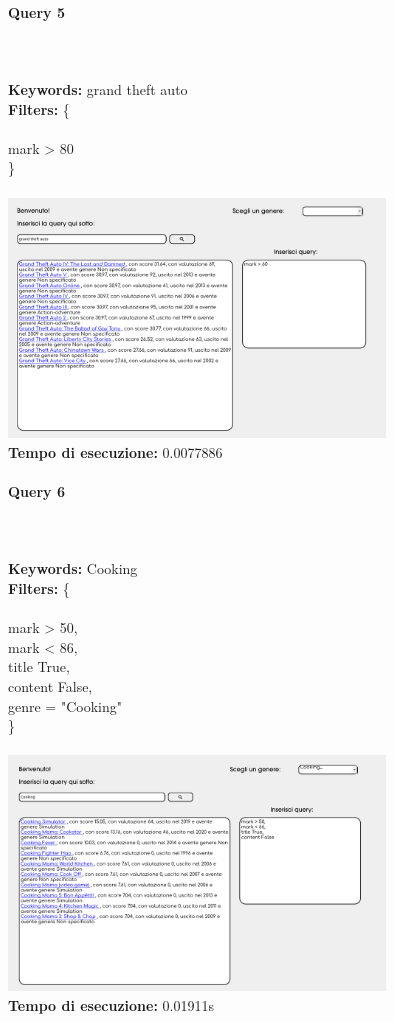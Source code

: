 \documentclass[12pt]{article}
\begin{document}
\paragraph{Query 5} ~ \\ \\

\noindent \textbf{Keywords: } grand theft auto \\
\textbf{Filters: } \{ \\ \\
\indent mark > 80 \\
\} \\\\

\noindent \includegraphics[width=100mm]{Immagini/Image5.png} \\
\textbf{Tempo di esecuzione:} 0.0077886 \\
\pagebreak

\paragraph{Query 6} ~ \\ \\

\noindent \textbf{Keywords: } Cooking \\
\textbf{Filters: } \{ \\ \\
\indent mark > 50, \\
\indent mark < 86, \\
\indent title True, \\
\indent content False, \\
\indent genre = "Cooking"\\
\} \\\\

\noindent \includegraphics[width=100mm]{Immagini/Image6.png} \\
\textbf{Tempo di esecuzione:} 0.01911s \\
\pagebreak
\end{document}

